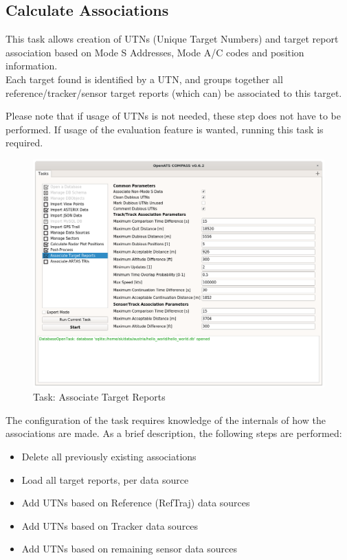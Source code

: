 \subsection{Calculate Associations}
\label{sec:task_associate_tr}

This task allows creation of UTNs (Unique Target Numbers) and target report association based on Mode S Addresses, Mode A/C codes and position information. \\

Each target found is identified by a UTN, and groups together all reference/tracker/sensor target reports (which can) be associated to this target.

Please note that if usage of UTNs is not needed, these step does not have to be performed. If usage of the evaluation feature is wanted, running this task is required. \\

\begin{figure}[H]
  \hspace*{-2.5cm}
    \includegraphics[width=19cm]{figures/tr_association_config.png}
  \caption{Task: Associate Target Reports}
\end{figure}

The configuration of the task requires knowledge of the internals of how the associations are made. As a brief description, the following steps are performed:

\begin{itemize}
\item Delete all previously existing associations
\item Load all target reports, per data source
\item Add UTNs based on Reference (RefTraj) data sources
\item Add UTNs based on Tracker data sources
\item Add UTNs based on remaining sensor data sources
\end{itemize}
\ \\

